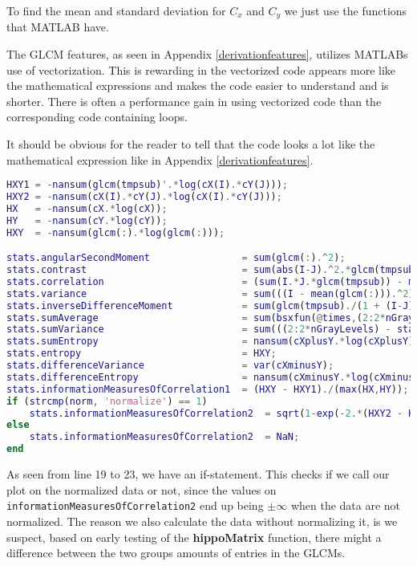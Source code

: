 To find the mean and standard deviation for $C_x$ and $C_y$ we just use the functions that MATLAB have.

The GLCM features, as seen in Appendix \ref{derivationfeatures}, utilizes MATLABs use of vectorization. This is rewarding in the vectorized code appears more like the mathematical expressions and makes the code easier to understand and is shorter. There is often a performance gain in using vectorized code than the corresponding code containing loops.

It should be obvious for the reader to tell that the code looks a lot like the mathematical expression like in Appendix \ref{derivationfeatures}.

\begin{lstlisting}[language=Matlab]
HXY1 = -nansum(glcm(tmpsub)'.*log(cX(I).*cY(J)));
HXY2 = -nansum(cX(I).*cY(J).*log(cX(I).*cY(J)));
HX   = -nansum(cX.*log(cX));
HY   = -nansum(cY.*log(cY));
HXY  = -nansum(glcm(:).*log(glcm(:)));

stats.angularSecondMoment                = sum(glcm(:).^2);
stats.contrast                           = sum(abs(I-J).^2.*glcm(tmpsub));
stats.correlation                        = (sum(I.*J.*glcm(tmpsub)) - muX*muY) ./ (stdX*stdY);
stats.variance                           = sum(((I - mean(glcm(:))).^2).*glcm(tmpsub));
stats.inverseDifferenceMoment            = sum(glcm(tmpsub)./(1 + (I-J).^2));
stats.sumAverage                         = sum(bsxfun(@times,(2:2*nGrayLevels)',cXplusY));
stats.sumVariance                        = sum(((2:2*nGrayLevels) - stats.sumAverage)'.^2.*cXplusY((2:2*nGrayLevels)-1,1));
stats.sumEntropy                         = nansum(cXplusY.*log(cXplusY));
stats.entropy                            = HXY;
stats.differenceVariance                 = var(cXminusY);
stats.differenceEntropy                  = nansum(cXminusY.*log(cXminusY));
stats.informationMeasuresOfCorrelation1  = (HXY - HXY1)./(max(HX,HY));
if (strcmp(norm, 'normalize') == 1)
    stats.informationMeasuresOfCorrelation2  = sqrt(1-exp(-2.*(HXY2 - HXY)));
else
    stats.informationMeasuresOfCorrelation2  = NaN;
end
\end{lstlisting}

As seen from line 19 to 23, we have an if-statement. This checks if we call our plot on the normalized data or not, since the values on \texttt{informationMeasuresOfCorrelation2} end up being $\pm \infty$ when the data are not normalized. The reason we also calculate the data without normalizing it, is we suspect, based on early testing of the \textbf{hippoMatrix} function, there might a difference between the two groups amounts of entries in the GLCMs.



